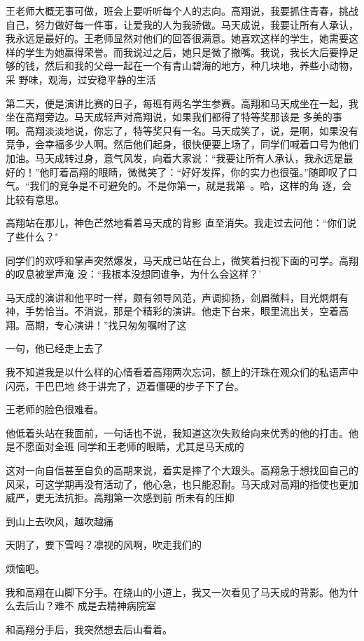 \documentclass{article}
\begin{document}
王老师大概无事可做，班会上要听听每个人的志向。高翔说，我要抓住青春，挑战自己，努力做好每一件事，让爱我的人为我骄做。马天成说，我要让所有人承认，我永远是最好的。王老师显然对他们的回答很满意。她喜欢这样的学生，她需要这样的学生为她赢得荣誉。而我说过之后，她只是微了撤嘴。我说，我长大后要挣足够的钱，然后和我的父母一起在一个有青山碧海的地方，种几块地，养些小动物，采
野味，观海，过安稳平静的生活 

第二天，便是演讲比赛的日子，每班有两名学生参赛。高翔和马天成坐在一起，我坐在高翔旁边。马天成轻声对高翔说，如果我们都得了特等奖那该是
\newpage
多美的事啊。高翔淡淡地说，你忘了，特等奖只有一名。马天成笑了，说，是啊，如果没有竞争，会幸福多少人啊。然后他们起身，很快便要上场了，同学们喊着口号为他们加油。马天成转过身，意气风发，向着大家说：“我要让所有人承认，我永远是最好的！”他盯着高翔的眼睛，微微笑了：“好好发挥，你的实力也很强。”随即叹了口气。“我们的竞争是不可避免的。不是你第一，就是我第--。哈，这样的角
逐，会比较有意思。 

高翔站在那儿，神色芒然地看着马天成的背影
直至消失。我走过去问他：“你们说了些什么？" 

同学们的欢呼和掌声突然爆发，马天成已站在台上，微笑着扫视下面的可学。高翔的叹息被掌声淹
没：“我根本没想同谁争，为什么会这样？' 

马天成的演讲和他平时一样，颇有领导风范，声调抑扬，剑眉微料，目光炯炯有神，手势恰当。不消说，那是个精彩的演讲。他走下台来，眼里流出关，空着高翔。高期，专心演讲！”找只匆匆嘱咐了这
\newpage

一句，他已经走上去了 

我不知道我是以什么样的心情看着高翔两次忘词，额上的汗珠在观众们的私语声中闪亮，干巴巴地
终于讲完了，迈着僵硬的步子下了台。 


王老师的脸色很难看。 

他低着头站在我面前，一句话也不说，我知道这次失败给向来优秀的他的打击。他是不愿面对全班
同学和王老师的眼睛，尤其是马天成的 

这对一向自信甚至自负的高期来说，着实是摔了个大跟头。高翔急于想找回自己的风采，可这学期再没有活动了，他心急，也只能忍耐。马天成对高翔的指使也更加威严，更无法抗拒。高翔第一次感到前
所未有的压抑 


到山上去吹风，越吹越痛 

天阴了，要下雪吗？凛视的风啊，吹走我们的
\newpage

烦恼吧。 

我和高翔在山脚下分手。在绕山的小道上，我又一次看见了马天成的背影。他为什么去后山？难不
成是去精神病院室 


和高翔分手后，我突然想去后山看着。 
\end{document}
